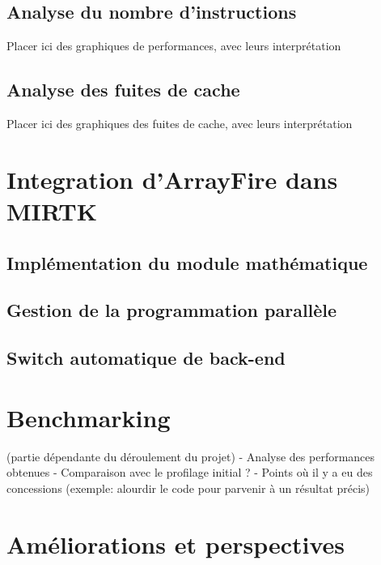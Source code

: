 \documentclass[10pt]{report}
\begin{document}
	\subsection{Analyse du nombre d'instructions}
	
	Placer ici des graphiques de performances, avec leurs interprétation
	\subsection{Analyse des fuites de cache}
	
	Placer ici des graphiques des fuites de cache, avec leurs interprétation
	
	\section{Integration d'ArrayFire dans MIRTK}
	\subsection{Implémentation du module mathématique}
	\subsection{Gestion de la programmation parallèle}
	\subsection{Switch automatique de back-end}
	\section{Benchmarking}
	(partie dépendante du déroulement du projet)\newline
	- Analyse des performances obtenues \newline
	- Comparaison avec le profilage initial ? \newline
	- Points où il y a eu des concessions (exemple: alourdir le code pour parvenir à un résultat précis)
	
	\section{Améliorations et perspectives}
\end{document}
